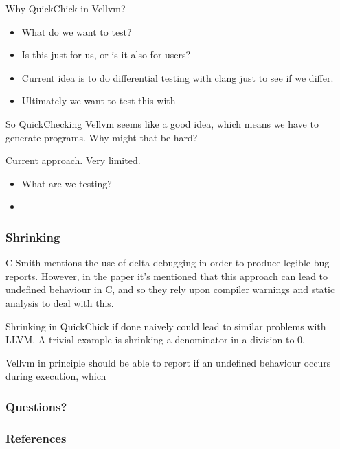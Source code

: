 \documentclass{beamer}
\begin{document}
\begin{frame}
  Why QuickChick in Vellvm?

  \begin{itemize}
  \item What do we want to test?
  \item Is this just for us, or is it also for users?
  \item Current idea is to do differential testing with clang just to
    see if we differ.
  \item Ultimately we want to test this with 
  \end{itemize}
\end{frame}

\begin{frame}
  So QuickChecking Vellvm seems like a good idea, which means we have
  to generate programs. Why might that be hard?
\end{frame}

\begin{frame}
  Current approach. Very limited.

  \begin{itemize}
  \item What are we testing?
  \item
  \end{itemize}
\end{frame}

\begin{frame}
  \frametitle{Shrinking}

  C Smith mentions the use of delta-debugging in order to produce
  legible bug reports. However, in the paper it's mentioned that this
  approach can lead to undefined behaviour in C, and so they rely upon
  compiler warnings and static analysis to deal with this.

  Shrinking in QuickChick if done naively could lead to similar
  problems with LLVM. A trivial example is shrinking a denominator in
  a division to 0.

  Vellvm in principle should be able to report if an undefined
  behaviour occurs during execution, which 
\end{frame}

\begin{frame}
  \frametitle{Questions?}

\end{frame}

\begin{frame}
  \frametitle{References}

  \nocite{*}
  \printbibliography
\end{frame}
\end{document}
